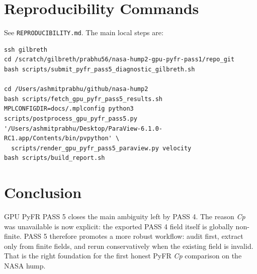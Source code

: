 \documentclass[11pt]{article}
\begin{document}
\section{Reproducibility Commands}
See \texttt{REPRODUCIBILITY.md}. The main local steps are:
\begin{lstlisting}[basicstyle=\ttfamily\small,breaklines=true]
ssh gilbreth
cd /scratch/gilbreth/prabhu56/nasa-hump2-gpu-pyfr-pass1/repo_git
bash scripts/submit_pyfr_pass5_diagnostic_gilbreth.sh

cd /Users/ashmitprabhu/github/nasa-hump2
bash scripts/fetch_gpu_pyfr_pass5_results.sh
MPLCONFIGDIR=docs/.mplconfig python3 scripts/postprocess_gpu_pyfr_pass5.py
'/Users/ashmitprabhu/Desktop/ParaView-6.1.0-RC1.app/Contents/bin/pvpython' \
  scripts/render_gpu_pyfr_pass5_paraview.py velocity
bash scripts/build_report.sh
\end{lstlisting}

\section{Conclusion}
GPU PyFR PASS 5 closes the main ambiguity left by PASS 4. The reason \textit{Cp} was unavailable is now explicit: the exported PASS 4 field itself is globally non-finite. PASS 5 therefore promotes a more robust workflow: audit first, extract only from finite fields, and rerun conservatively when the existing field is invalid. That is the right foundation for the first honest PyFR \textit{Cp} comparison on the NASA hump.



\end{document}
